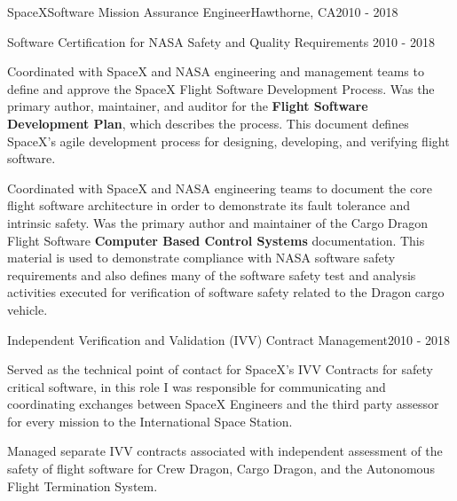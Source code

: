 \begin{cventries}
  \cventry
  {SpaceX}{Software Mission Assurance Engineer}{Hawthorne, CA}{2010 - 2018}
  {}

  \cventry
  {Software Certification for NASA Safety and Quality Requirements}
  {}{}{2010 - 2018}
  {
    \begin{cvitems}
    \item Coordinated with SpaceX and NASA engineering and management teams to define and approve
      the SpaceX Flight Software Development Process. Was the primary author, maintainer, and
      auditor for the \textbf{Flight Software Development Plan}, which describes the process. This
      document defines SpaceX's agile development process for designing, developing, and verifying
      flight software.
    \item Coordinated with SpaceX and NASA engineering teams to document the core flight software
      architecture in order to demonstrate its fault tolerance and intrinsic safety. Was the primary
      author and maintainer of the Cargo Dragon Flight Software \textbf{Computer Based Control
      Systems} documentation. This material is used to demonstrate compliance with NASA software
      safety requirements and also defines many of the software safety test and analysis activities
      executed for verification of software safety related to the Dragon cargo vehicle.
    \end{cvitems}
  }


  \cventry
  {Independent Verification and Validation (IVV) Contract Management}{}{}{2010 - 2018}
  {
    \begin{cvitems}
    \item Served as the technical point of contact for SpaceX's IVV Contracts for safety critical
      software, in this role I was responsible for communicating and coordinating exchanges between
      SpaceX Engineers and the third party assessor for every mission to the International Space
      Station.
    \item Managed separate IVV contracts associated with independent assessment of the safety of
      flight software for Crew Dragon, Cargo Dragon, and the Autonomous Flight Termination System.
    \end{cvitems}
  }



\end{cventries}
